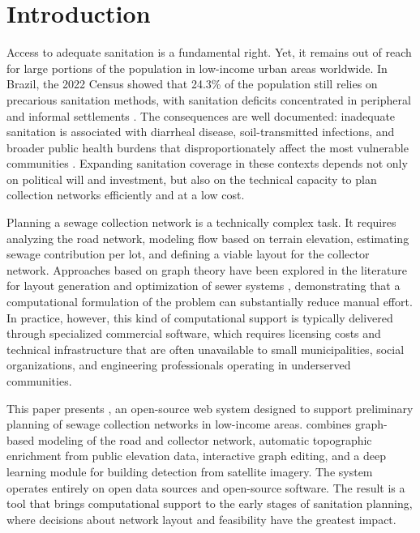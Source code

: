 \section{Introduction}\label{sec:introduction}

Access to adequate sanitation is a fundamental right.
Yet, it remains out of reach for large portions of the population in low-income urban areas worldwide.
In Brazil, the 2022 Census showed that 24.3\% of the population still relies on precarious sanitation methods, with sanitation deficits concentrated in peripheral and informal settlements \cite{IBGE2024censo}.
The consequences are well documented: inadequate sanitation is associated with diarrheal disease, soil-transmitted infections, and broader public health burdens that disproportionately affect the most vulnerable communities \cite{PrssUstn2019}.
Expanding sanitation coverage in these contexts depends not only on political will and investment, but also on the technical capacity to plan collection networks efficiently and at a low cost.

Planning a sewage collection network is a technically complex task.
It requires analyzing the road network, modeling flow based on terrain elevation, estimating sewage contribution per lot, and defining a viable layout for the collector network.
Approaches based on graph theory have been explored in the literature for layout generation and optimization of sewer systems \cite{Turan2019}, demonstrating that a computational formulation of the problem can substantially reduce manual effort.
In practice, however, this kind of computational support is typically delivered through specialized commercial software, which requires licensing costs and technical infrastructure that are often unavailable to small municipalities, social organizations, and engineering professionals operating in underserved communities.

This paper presents \method, an open-source web system designed to support preliminary planning of sewage collection networks in low-income areas.
\method combines graph-based modeling of the road and collector network, automatic topographic enrichment from public elevation data, interactive graph editing, and a deep learning module for building detection from satellite imagery.
The system operates entirely on open data sources and open-source software.
The result is a tool that brings computational support to the early stages of sanitation planning, where decisions about network layout and feasibility have the greatest impact.


